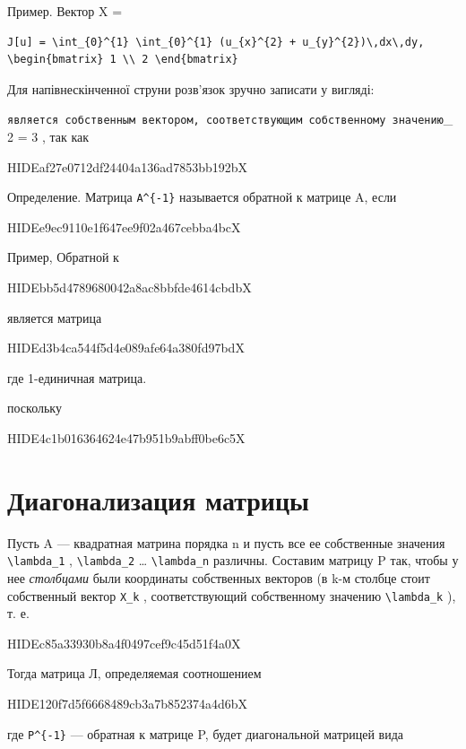 \documentclass[
  ukrainian,
]{article}
\begin{document}
Пример. Вектор X =

\begin{verbatim}
J[u] = \int_{0}^{1} \int_{0}^{1} (u_{x}^{2} + u_{y}^{2})\,dx\,dy,
\begin{bmatrix} 1 \\ 2 \end{bmatrix}
\end{verbatim}

Для напівнескінченної струни розв'язок зручно записати у вигляді:

\texttt{является\ собственным\ вектором,\ соответствующим\ собственному\ значению}\lambda\_2
= 3 , так как

HIDEaf27e0712df24404a136ad7853bb192bX

Определение. Матрица \texttt{A\^{}\{-1\}} называется обратной к матрице
A, если

HIDEe9ec9110e1f647ee9f02a467cebba4bcX

Пример, Обратной к

HIDEbb5d4789680042a8ac8bbfde4614cbdbX

является матрица

HIDEd3b4ca544f5d4e089afe64a380fd97bdX

где 1-единичная матрица.

поскольку

HIDE4c1b016364624e47b951b9abff0be6c5X

\section{Диагонализация
матрицы}\label{ux434ux438ux430ux433ux43eux43dux430ux43bux438ux437ux430ux446ux438ux44f-ux43cux430ux442ux440ux438ux446ux44b}

Пусть A --- квадратная матрина порядка n и пусть все ее собственные
значения \texttt{\textbackslash{}lambda\_1} ,
\texttt{\textbackslash{}lambda\_2} \ldots{}
\texttt{\textbackslash{}lambda\_n} различны. Составим матрицу P так,
чтобы у нее \emph{столбцами} были координаты собственных векторов (в k-м
столбце стоит собственный вектор \texttt{X\_k} , соответствующий
собственному значению \texttt{\textbackslash{}lambda\_k} ), т. е.

HIDEc85a33930b8a4f0497cef9c45d51f4a0X

Тогда матрица Л, определяемая соотношением

HIDE120f7d5f6668489cb3a7b852374a4d6bX

где \texttt{P\^{}\{-1\}} --- обратная к матрице P, будет диагональной
матрицей вида
\end{document}
